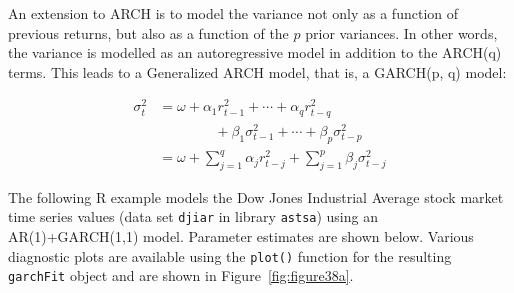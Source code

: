 An extension to ARCH is to model the variance not only as a function of previous returns, but also as a function of the $p$ prior variances. In other words, the variance is modelled as an autoregressive model in addition to the ARCH(q) terms. This leads to a Generalized ARCH model, that is, a GARCH(p, q) model:

\begin{align*}
\sigma_t^2 &= \omega + \alpha_1 r_{t-1}^2 + \cdots + \alpha_q r_{t-q}^2 \\
           & \qquad \qquad + \beta_1 \sigma_{t-1}^2 + \cdots + \beta_p \sigma_{t-p}^2 \\
           &= \omega + \sum_{j=1}^q \alpha_j r_{t-j}^2 + \sum_{j=1}^p \beta_j \sigma_{t-j}^2
\end{align*}

The following R example models the Dow Jones Industrial Average stock market time series values (data set \texttt{djiar} in library \texttt{astsa}) using an AR(1)+GARCH(1,1) model. Parameter estimates are shown below. Various diagnostic plots are available using the \texttt{plot()} function for the resulting \texttt{garchFit} object and are shown in Figure~\ref{fig:figure38a}. 

\begin{samepage}
\end{samepage}

